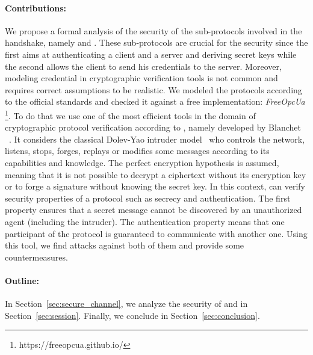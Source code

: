 \paragraph{Contributions:}

We propose a formal analysis of the security of
the sub-protocols involved in the \opcua handshake, namely \opcua{}
\securechan and \opcua{} \session. 
These sub-protocols are crucial for the security since the first aims at
authenticating a client and a server and deriving secret keys while the second
allows the client to send his credentials to the server.
Moreover, modeling credential in cryptographic verification tools is not common
and requires correct assumptions to be realistic.
We modeled the protocols according to the official \opcua standards and
checked it against a free implementation: {\em FreeOpcUa}
\footnote{https://freeopcua.github.io/}.
To do that we use one of the most efficient tools in the domain of
cryptographic protocol verification according to \cite{LP15},
namely \proverif developed by Blanchet \etal~\cite{Bla01}. 
It considers the classical Dolev-Yao intruder model~\cite{DY81} who
controls the network, listens, stops, forges,
replays or modifies some messages according to its capabilities and
knowledge.  The perfect encryption hypothesis is assumed, meaning that
it is not possible to decrypt a ciphertext without its encryption key
or to forge a signature without knowing the secret key.  In this
context, \proverif{} can verify security properties of a protocol such
as secrecy and authentication.  The first property ensures that a
secret message cannot be discovered by an unauthorized agent
(including the intruder).  The authentication property means that one
participant of the protocol is guaranteed to communicate with another
one. Using this tool, we find attacks against both of them and provide
some countermeasures.

\paragraph{Outline:} In Section~\ref{sec:secure_channel}, we analyze the
security of \opcua{} \securechan and \opcua{} \session in
Section~\ref{sec:session}.  Finally, we conclude in
Section~\ref{sec:conclusion}.

